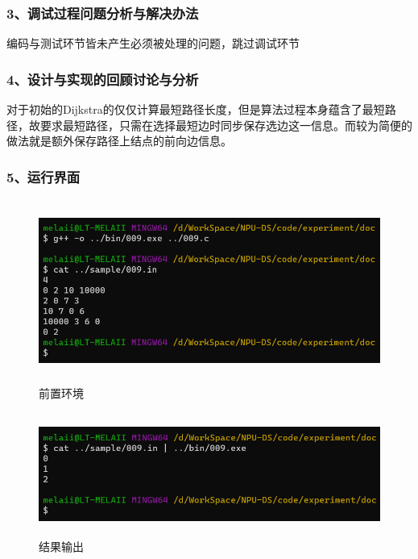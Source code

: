 \documentclass[UTF8, a4paper]{ctexart}
\begin{document}
\subsubsection*{3、调试过程问题分析与解决办法}
编码与测试环节皆未产生必须被处理的问题，跳过调试环节 \par
\subsubsection*{4、设计与实现的回顾讨论与分析}
对于初始的Dijkstra的仅仅计算最短路径长度，但是算法过程本身蕴含了最短路径，故要求最短路径，只需在选择最短边时同步保存选边这一信息。而较为简便的做法就是额外保存路径上结点的前向边信息。 \par
\subsubsection*{5、运行界面}
\begin{figure}[H]
	\begin{minipage}[t]{\linewidth}
		\centering
		\includegraphics[width=125mm,height=60mm]{./assets/DS09-2}
		\caption{前置环境}
	\end{minipage}
\end{figure}
\begin{figure}[H]
	\begin{minipage}[t]{\linewidth}
		\centering
		\includegraphics[width=125mm,height=40mm]{./assets/DS09-3}
		\caption{结果输出}
	\end{minipage}
\end{figure}
\end{document}
